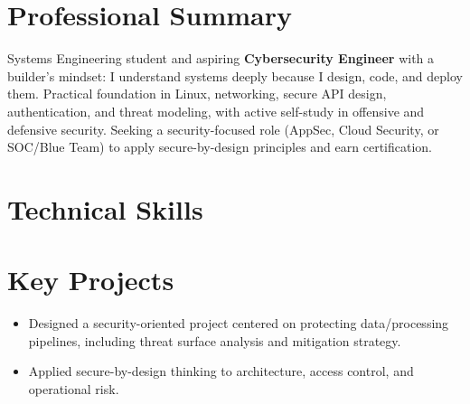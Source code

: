 \documentclass[10pt]{article}
\begin{document}

\section{Professional Summary}
Systems Engineering student and aspiring \textbf{Cybersecurity Engineer} with a builder's
mindset: I understand systems deeply because I design, code, and deploy them. Practical
foundation in Linux, networking, secure API design, authentication, and threat modeling, with
active self-study in offensive and defensive security. Seeking a security-focused role (AppSec,
Cloud Security, or SOC/Blue Team) to apply secure-by-design principles and earn certification.

\section{Technical Skills}

\section{Key Projects}

\begin{itemize}
  \item Designed a security-oriented project centered on protecting data/processing pipelines, including threat surface analysis and mitigation strategy.
  \item Applied secure-by-design thinking to architecture, access control, and operational risk.
\end{itemize}
\end{document}
